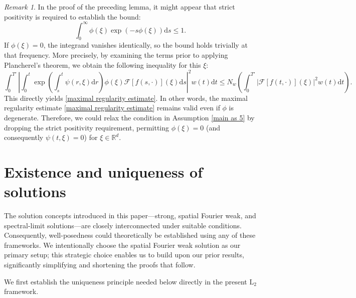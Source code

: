 \documentclass[11pt,reqno]{amsart}
\theoremstyle{definition}
\theoremstyle{remark}
\newtheorem{rem}[thm]{Remark}
\newcommand\bR{\mathbb{R}}
\newcommand\cF{\mathcal{F}}
\numberwithin{equation}{section}
\newcommand{\mysection}[1]{\section{#1}}
\begin{document}
\begin{rem}
									\label{phi zero lemma}
In the proof of the preceding lemma, it might appear that strict positivity is required to establish the bound:
$$
\int^\infty_{0}  \phi(\xi) \exp\left( -s \phi(\xi) \right)  \mathrm{d}s \leq 1.
$$
If $\phi(\xi) = 0$, the integrand vanishes identically, so the bound holds trivially at that frequency.
 More precisely, by examining the terms prior to applying Plancherel's theorem, we obtain the following inequality for this $\xi$:
$$
\int_0^{T'} \left|\int_0^t \exp\left( \int_s^t\psi(r,\xi) \mathrm{d}r \right) \phi(\xi) \cF[f(s,\cdot)](\xi) \mathrm{d}s\right|^2  w(t) \mathrm{d}t \leq N_w \left(\int_{0}^{T'}  |\cF[f(t,\cdot)](\xi)|^2 w(t) \mathrm{d}t \right).
$$
This directly yields \eqref{maximal regularity estimate}.
 In other words, the maximal regularity estimate \eqref{maximal regularity estimate} remains valid even if $\phi$ is degenerate. 
Therefore, we could relax the condition in Assumption \ref{main as 5} by dropping the strict positivity requirement, permitting $\phi(\xi) = 0$ (and consequently $\psi(t,\xi) = 0$) for $\xi \in \bR^d$.
\end{rem}



		


\mysection{Existence and uniqueness of solutions}
											\label{ex uni section}



The solution concepts introduced in this paper—strong, spatial Fourier weak, and spectral-limit solutions—are closely interconnected under suitable conditions. 
Consequently, well-posedness could theoretically be established using any of these frameworks. 
We intentionally choose the spatial Fourier weak solution as our primary setup; this strategic choice enables us to build upon our prior results, significantly simplifying and shortening the proofs that follow.



We first establish the uniqueness principle needed below directly in the present
$\mathrm{L}_2$ framework.
\end{document}

